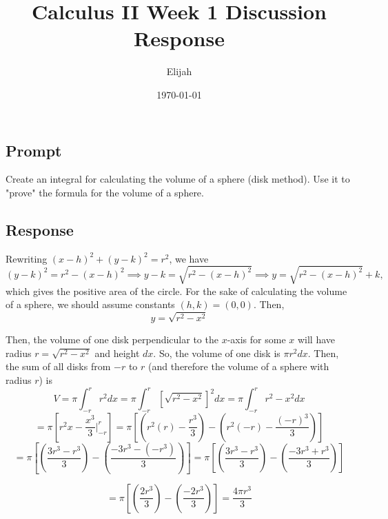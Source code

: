 \documentclass[12pt]{article}
\title{Calculus II Week 1 Discussion Response}
\author{Elijah}
\date{\today}
\begin{document}
\maketitle

\subsection{Prompt}
Create an integral for calculating the volume of a sphere (disk method). Use it to "prove" the formula for the volume of a sphere.

\subsection{Response}
Rewriting \((x-h)^2 + (y-k)^2 = r^2\), we have
\[
(y-k)^2 = r^2 - (x-h)^2 \implies y-k = \sqrt{r^2 - (x-h)^2} \implies y = \sqrt{r^2 - (x-h)^2} + k,
\]
which gives the positive area of the circle. For the sake of calculating the volume of a sphere, we should assume constants \((h,k)=(0,0)\). Then, 
\[y=\sqrt{r^2-x^2}\]

Then, the volume of one disk perpendicular to the \(x\)-axis for some \(x\) will have radius \(r = \sqrt{r^2-x^2}\) and height \(dx\). So, the volume of one disk is \(\pi r^2dx\). Then, the sum of all disks from \(-r\) to \(r\) (and therefore the volume of a sphere with radius \(r\)) is \[V=\pi\int_{-r}^r r^2dx=\pi\int_{-r}^r\left[\sqrt{r^2-x^2}\right]^2dx=\pi\int_{-r}^{r}r^2-x^2dx\] 
\[=\pi\left[r^2x-\frac{x^3}{3}\Big|_{-r}^{r}\right]=\pi\left[\left(r^2(r)-\frac{r^3}{3}\right)-\left(r^2(-r)-\frac{(-r)^3}{3}\right)\right]\]
\[=\pi\left[\left(\frac{3r^3-r^3}{3}\right)-\left(\frac{-3r^3-(-r^3)}{3}\right)\right]=\pi\left[\left(\frac{3r^3-r^3}{3}\right)-\left(\frac{-3r^3+r^3}{3}\right)\right]\]

\[=\pi\left[\left(\frac{2r^3}{3}\right)-\left(\frac{-2r^3}{3}\right)\right]=\boxed{\frac{4\pi r^3}{3}}\]
\end{document}
